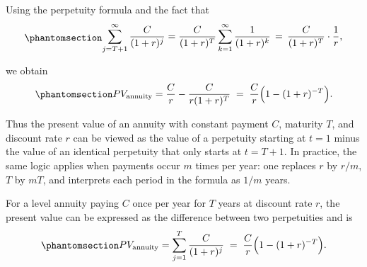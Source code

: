\documentclass[
  letterpaper,
  DIV=11,
  numbers=noendperiod]{scrreprt}
\begin{document}
Using the perpetuity formula and the fact that
\begin{equation}\protect\phantomsection\label{eq-perpetuity-shifted}{
\begin{align}
    \sum_{j=T+1}^{\infty} \frac{C}{(1 + r)^j}
    = \frac{C}{(1 + r)^T} \sum_{k=1}^{\infty} \frac{1}{(1 + r)^k}
    \,=\, \frac{C}{(1 + r)^T} \cdot \frac{1}{r},
\end{align}
}\end{equation}

we obtain
\begin{equation}\protect\phantomsection\label{eq-annuity-value}{
\begin{align}
    PV_{\text{annuity}} = \frac{C}{r} - \frac{C}{r(1 + r)^T} \;=\; \frac{C}{r} \Big(1 - (1 + r)^{-T}\Big).
\end{align}
}\end{equation}

Thus the present value of an annuity with constant payment \(C\),
maturity \(T\), and discount rate \(r\) can be viewed as the value of a
perpetuity starting at \(t=1\) minus the value of an identical
perpetuity that only starts at \(t=T+1\). In practice, the same logic
applies when payments occur \(m\) times per year: one replaces \(r\) by
\(r/m\), \(T\) by \(mT\), and interprets each period in the formula as
\(1/m\) years.

\begin{tcolorbox}[enhanced jigsaw, arc=.35mm, bottomrule=.15mm, bottomtitle=1mm, breakable, colback=white, colbacktitle=quarto-callout-note-color!10!white, colframe=quarto-callout-note-color-frame, coltitle=black, left=2mm, leftrule=.75mm, opacityback=0, opacitybacktitle=0.6, rightrule=.15mm, title=\textcolor{quarto-callout-note-color}{\faInfo}\hspace{0.5em}{Note}, titlerule=0mm, toprule=.15mm, toptitle=1mm]

For a level annuity paying \(C\) once per year for \(T\) years at
discount rate \(r\), the present value can be expressed as the
difference between two perpetuities and is
\begin{equation}\protect\phantomsection\label{eq-gen-0001}{
\begin{align}
    PV_{\text{annuity}}
    = \sum_{j=1}^{T} \frac{C}{(1 + r)^j}
     \;=\; \frac{C}{r}\Big(1 - (1 + r)^{-T}\Big).
\end{align}
}\end{equation}

\end{tcolorbox}
\end{document}

